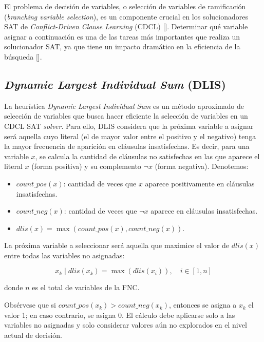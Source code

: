 El problema de decisi\'on de variables, o selección de variables de ramificación (\textit{branching variable selection}), es un componente crucial en los solucionadores SAT de \textit{Conflict-Driven Clause Learning} (CDCL) [\cite{sun2024autosat}]. Determinar qué variable asignar a continuación es una de las tareas más importantes que realiza un solucionador SAT, ya que tiene un impacto dramático en la eficiencia de la búsqueda [\cite{chowdhury2020conflict_depression}].



\subsection{\textit{Dynamic Largest Individual Sum} (DLIS)}
\label{sec}
La heur\'istica \textit{Dynamic Largest Individual Sum} es un m\'etodo aproximado de selecci\'on de variables que busca hacer eficiente la selecci\'on de variables en un CDCL SAT \textit{solver}. Para ello, DLIS considera que la pr\'oxima variable a asignar ser\'a aquella cuyo literal (el de mayor valor entre el positivo y el negativo) tenga la mayor frecuencia de aparici\'on en cl\'ausulas insatisfechas. Es decir, para una variable $x$, se calcula la cantidad de cl\'ausulas no satisfechas en las que aparece el literal $x$ (forma positiva) y su complemento $\neg x$ (forma negativa). Denotemos:

\begin{itemize}
  \item $\textit{count\_pos}(x)$: cantidad de veces que $x$ aparece positivamente en cl\'ausulas insatisfechas.
  \item $\textit{count\_neg}(x)$: cantidad de veces que $\neg x$ aparece en cl\'ausulas insatisfechas.
  \item $\textit{dlis}(x) = \max(\textit{count\_pos}(x), \textit{count\_neg}(x))$.
\end{itemize}

La pr\'oxima variable a seleccionar ser\'a aquella que maximice el valor de $\textit{dlis}(x)$ entre todas las variables no asignadas:

\begin{equation*}
  x_k \mid \textit{dlis}(x_k) = \max(\textit{dlis}(x_i)),\quad i \in [1,n]
\end{equation*}

donde $n$ es el total de variables de la FNC.

Obs\'ervese que si $\textit{count\_pos}(x_k) > \textit{count\_neg}(x_k)$, entonces se asigna a $x_k$ el valor 1; en caso contrario, se asigna 0. El c\'alculo debe aplicarse solo a las variables no asignadas y solo considerar valores a\'{u}n no explorados en el nivel actual de decisi\'on.


